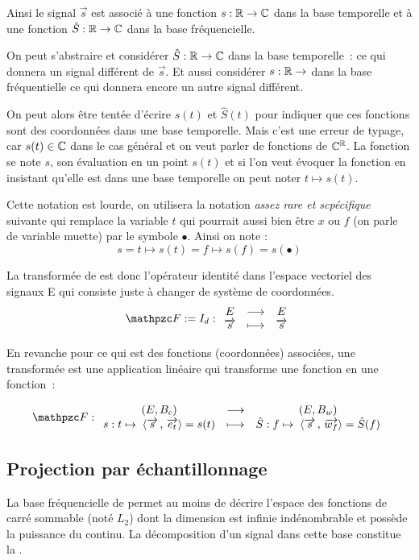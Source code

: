 Ainsi le signal $\vec{s}$ est associé à une fonction $s:\mathbb{R}\to\mathbb{C}$ dans
la base temporelle et à une fonction $\hat{S}:\mathbb{R}\to\mathbb{C}$ dans la base
fréquencielle.

On peut s'abstraire et considérer $\hat{S}:\mathbb{R}\to\mathbb{C}$ dans la base
temporelle~: ce qui donnera un signal différent de $\vec{s}$. Et aussi
considérer $s:\mathbb{R}\to$ dans la base fréquentielle ce qui donnera encore
un autre signal différent.

\begin{remarque}
  On peut alors être tentée d'écrire $s(t)$ et $\hat{S}(t)$ pour
  indiquer que ces fonctions sont des coordonnées dans une base
  temporelle. Mais c'est une erreur de typage, car $s(t)\in\mathbb{C}$ dans le
  cas général et on veut parler de fonctions de $\mathbb{C}^{\mathbb{R}}$. La fonction
  se note $s$, son évaluation en un point $s(t)$ et si l'on veut
  évoquer la fonction en insistant qu'elle est dans une base
  temporelle on peut noter $t\mapsto s(t)$.

  Cette notation est lourde, on utilisera la notation \emph{assez rare
    et scpécifique} suivante qui remplace la variable $t$ qui pourrait
  aussi bien être $x$ ou $f$ (on parle de variable muette) par le
  symbole $\bullet$. Ainsi on note :
  $$ s = t\mapsto s(t) = f \mapsto s(f) = s(\bullet)$$
\end{remarque}

La transformée de \Fourier{} est donc l'opérateur identité dans
l'espace vectoriel des signaux E qui consiste juste à changer de
système de coordonnées.
$$\F := I_d :  \application{E}{E}{\vec{s}}{\vec{s}}
$$

En revanche pour ce qui est des fonctions (coordonnées) associées, une
transformée est une application linéaire qui transforme une fonction
en une fonction~:

$$\F : \application{(E,B_c)}{(E,B_w)}{s : t\mapsto \;\scal{\vec{s}}{\vec{e_t}}=s(t)}{\hat{S} : f \mapsto \; \scal{\vec{s}}{\vec{w_f}}=\hat{S}(f)}
$$

\subsection{Projection par échantillonnage}

La base fréquencielle de \Fourier{} permet au moins de décrire
l'espace des fonctions de carré sommable (noté $L_2$) dont la
dimension est infinie indénombrable et possède la puissance du
continu. La décomposition d'un signal dans cette base constitue la
\TF.

